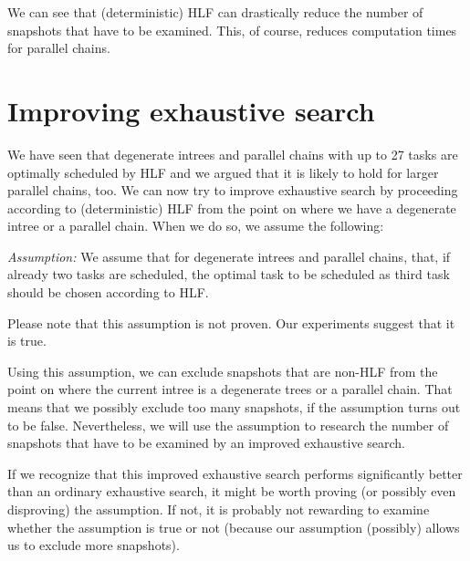 We can see that (deterministic) HLF can drastically reduce the number of snapshots that have to be examined. This, of course, reduces computation times for parallel chains.

\section{Improving exhaustive search}
\label{sec:improving-exhaustive-search}

We have seen that degenerate intrees and parallel chains with up to 27 tasks are optimally scheduled by HLF and we argued that it is likely to hold for larger parallel chains, too. We can now try to improve exhaustive search by proceeding according to (deterministic) HLF from the point on where we have a degenerate intree or a parallel chain. When we do so, we assume the following:

\emph{Assumption:} We assume that for degenerate intrees and parallel chains, that, if already two tasks are scheduled, the optimal task to be scheduled as third task should be chosen according to HLF.

Please note that this assumption is not proven. Our experiments suggest that it is true.

Using this assumption, we can exclude snapshots that are non-HLF from the point on where the current intree is a degenerate trees or a parallel chain. That means that we possibly exclude too many snapshots, if the assumption turns out to be false. Nevertheless, we will use the assumption to research the number of snapshots that have to be examined by an improved exhaustive search. 

If we recognize that this improved exhaustive search performs significantly better than an ordinary exhaustive search, it might be worth proving (or possibly even disproving) the assumption. If not, it is probably not rewarding to examine whether the assumption is true or not (because our assumption (possibly) allows us to exclude more snapshots).

